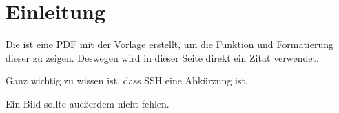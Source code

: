\section{Einleitung}
Die ist eine PDF mit der Vorlage erstellt, um die Funktion und Formatierung dieser zu zeigen.
Deswegen wird in dieser Seite direkt ein Zitat verwendet.

Ganz wichtig zu wissen ist, dass \ac*{SSH} eine Abkürzung ist.

Ein Bild sollte aueßerdem nicht fehlen.
\newpage